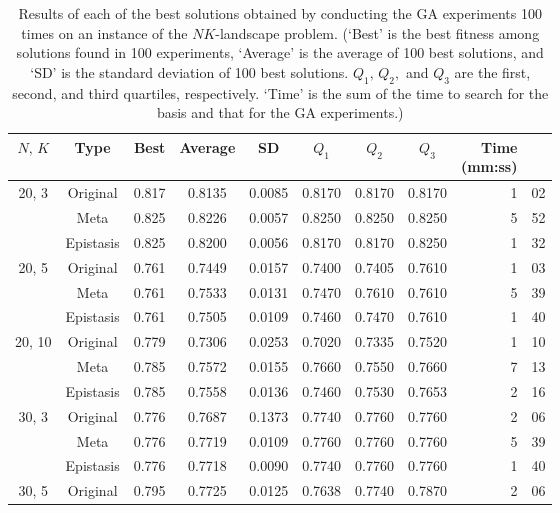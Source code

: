 \begin{table}[H]
	\centering
		\caption{Results of each of the best solutions obtained by conducting the GA experiments 100 times on an instance of the $ NK $-landscape problem. (`Best' is the best fitness among solutions found in 100 experiments, `Average' is the average of 100 best solutions, and `SD' is the standard deviation of 100 best solutions. $ Q_1, \, Q_2, $ and $ Q_3 $ are the first, second, and third quartiles, respectively. `Time' is the sum of the time to search for the basis and that for the GA experiments.)} \label{tab:result_nk}
	\vspace*{0.2cm}
	\begin{threeparttable}
	\begin{tabular}{ccccccccr@{:}l}
	\toprule
	$ N,\, K$ & Type & Best & Average & SD & $ Q_1 $ & $ Q_2 $ & $ Q_3 $ & \multithead{2}{Time \\ (mm:ss)\tnote{*}} \\
	\midrule
	\multirow{3}{*}{20, 3}	& Original  & 0.817 & 0.8135 & 0.0085 & 0.8170 & 0.8170 & 0.8170 & 1 & 02 \\
							& Meta	    & 0.825 & 0.8226 & 0.0057 & 0.8250 & 0.8250 & 0.8250 & 5 & 52 \\
							& Epistasis & 0.825 & 0.8200 & 0.0056 & 0.8170 & 0.8170 & 0.8250 & 1 & 32 \\
	\midrule
	\multirow{3}{*}{20, 5}	& Original  & 0.761 & 0.7449 & 0.0157 & 0.7400 & 0.7405 & 0.7610 & 1 & 03 \\
							& Meta	    & 0.761 & 0.7533 & 0.0131 & 0.7470 & 0.7610 & 0.7610 & 5 & 39 \\
							& Epistasis & 0.761 & 0.7505 & 0.0109 & 0.7460 & 0.7470 & 0.7610 & 1 & 40 \\
	\midrule
	\multirow{3}{*}{20, 10}	& Original  & 0.779 & 0.7306 & 0.0253 & 0.7020 & 0.7335 & 0.7520 & 1 & 10 \\
							& Meta      & 0.785 & 0.7572 & 0.0155 & 0.7660 & 0.7550 & 0.7660 & 7 & 13 \\
							& Epistasis & 0.785 & 0.7558 & 0.0136 & 0.7460 & 0.7530 & 0.7653 & 2 & 16 \\
	\midrule
	\multirow{3}{*}{30, 3}	& Original  & 0.776 & 0.7687 & 0.1373 & 0.7740 & 0.7760 & 0.7760 & 2 & 06 \\
							& Meta      & 0.776 & 0.7719 & 0.0109 & 0.7760 & 0.7760 & 0.7760 & 5 & 39 \\
							& Epistasis & 0.776 & 0.7718 & 0.0090 & 0.7740 & 0.7760 & 0.7760 & 1 & 40 \\
	\midrule
	\multirow{3}{*}{30, 5}	& Original  & 0.795 & 0.7725 & 0.0125 & 0.7638 & 0.7740 & 0.7870 & 2 & 06 \\

\end{tabular}
\end{threeparttable}
\end{table}
